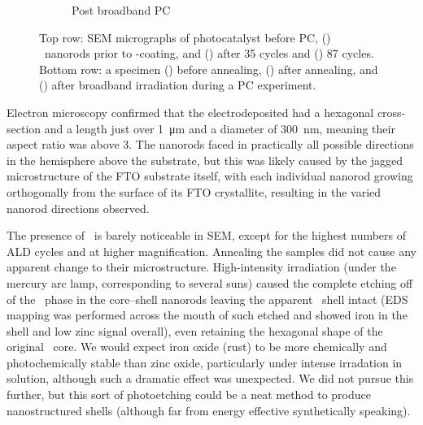 \documentclass[webedition,openright,titles,swedish,english]{LuaUUThesis}\usepackage[]{graphicx}\usepackage[]{xcolor}
\begin{document}
\begin{figure}[tbp]
\begin{subfigure}[b]{0.31\textwidth}
\caption{Post broadband PC}
\label{fig:SEM-post-broadbandPC}
\end{subfigure}%
\caption[SEM micrographs / nanorods]{%
  Top row: \protect\gls{SEM} micrographs of photocatalyst before \protect\gls{PC},
  () \ZnO\ nanorods prior to \ironox-coating, and
  () after 35 cycles and
  () 87 cycles.
  Bottom row: a specimen
  () before annealing,
  () after annealing, and
  () after broadband irradiation during a \protect\gls{PC} experiment.
}
\label{fig:SEM-87-all-steps}
\end{figure}

Electron microscopy confirmed that the electrodeposited 
had a hexagonal cross-section and a length just over \qty{1}{\um} and a diameter
of \qty{300}{\nm}, meaning their aspect ratio was above \num{3}.
The nanorods faced in practically all possible directions in the hemisphere above
the substrate, but this was likely caused by the jagged microstructure of the
\gls{FTO} substrate itself, with each individual nanorod growing orthogonally
from the surface of its \gls{FTO} crystallite, resulting in the varied nanorod
directions observed.

The presence of \ironox\ is barely noticeable in \gls{SEM}, except for the highest
numbers of \gls{ALD} cycles and at higher magnification.
Annealing the samples did not cause any apparent change to their microstructure.
High-intensity irradiation (under the mercury arc lamp, corresponding to several suns)
caused the complete etching off of the \ZnO\ phase in the
core--shell nanorods leaving the apparent \ironox\ shell intact
(\gls{EDS} mapping was performed across the mouth of such etched 
and showed iron in the shell and low zinc signal overall),
even retaining the hexagonal shape of the original \ZnO\ core.
We would expect iron oxide (rust) to be more chemically and photochemically stable
than zinc oxide, particularly under intense irradation in solution, although
such a dramatic effect was unexpected.
We did not pursue this further, but this sort of photoetching could be a neat
method to produce nanostructured shells (although far from energy effective
synthetically speaking).



%

\end{document}
